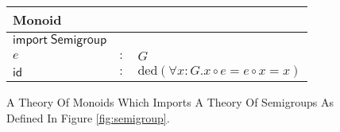 \begin{figure}[h]
  \begin{center}
    \begin{tabular}{|l c l|}
      \hline
      \textsf{Monoid} & &\\\hline
      $ \mathsf{import \ Semigroup}$ &&\\
      \hline
      $e$ & $:$ & $G$\\
      $ \mathsf{id}$& $:$ & $ \text{ded}\left( \forall x : G . x\circ e = e \circ x = x\right)$\\\hline
    \end{tabular}
  \end{center}
  \caption{A Theory Of Monoids Which Imports A Theory Of Semigroups As Defined In Figure \ref{fig:semigroup}. }
  \label{fig:monoid}
\end{figure}
